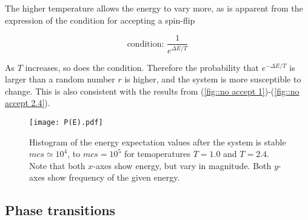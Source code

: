 \documentclass[11pt]{article}
\begin{document}
\begin{flushleft}
The higher temperature allows the energy to vary more, as is apparent from the expression of the condition for accepting a spin-flip

\begin{equation*}
\text{condition: } \frac{1}{e^{\Delta E/T}} 
\end{equation*}

As $T$ increases, so does the condition. Therefore the probability that $e^{-\Delta E/T}$ is larger than a random number $r$ is higher, and the system is more susceptible to change. This is also consistent with the results from (\ref{fig::no accept 1})-(\ref{fig::no accept 2.4}).


\begin{figure}[H]
\centering
\texttt{[image: P(E).pdf]}
\caption{Histogram of the energy expectation values after the system is stable $mcs \simeq 10^4$, to $mcs= 10^5$ for temoperatures $T=1.0$ and $T=2.4$. Note that both $x$-axes show energy, but vary in magnitude. Both $y$-axes show frequency of the given energy.}
\label{fig::P(E)}
\end{figure}


\end{flushleft}

\subsection*{Phase transitions}
\end{document}

